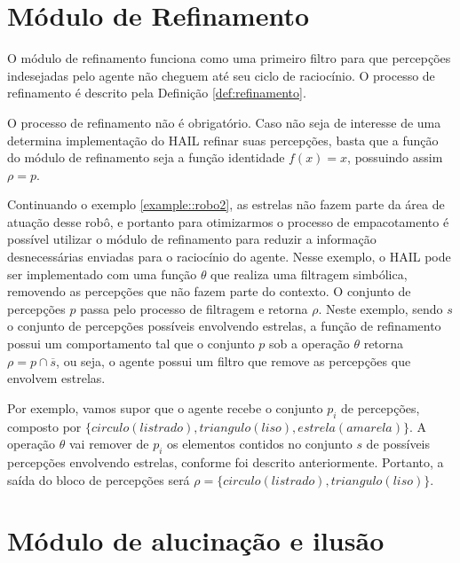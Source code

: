 \section{Módulo de Refinamento}

\label{refinamento}

O módulo de refinamento funciona como uma primeiro filtro para que percepções indesejadas pelo agente não cheguem até seu ciclo de raciocínio. O processo de refinamento é descrito pela Definição \ref{def:refinamento}.

O processo de refinamento não é obrigatório. Caso não seja de interesse de uma determina implementação do HAIL refinar suas percepções, basta que a função do módulo de refinamento seja a função identidade $f(x) = x$, possuindo assim $\rho = p$.

\begin{example}
    Continuando o exemplo \ref{example::robo2}, as estrelas não fazem parte da área de atuação desse robô, e portanto para otimizarmos o processo de empacotamento é possível utilizar o módulo de refinamento para reduzir a informação desnecessárias enviadas para o raciocínio do agente. Nesse exemplo, o HAIL pode ser implementado com uma função $\theta$ que realiza uma filtragem simbólica, removendo as percepções que não fazem parte do contexto. O conjunto de percepções $p$ passa pelo processo de filtragem e retorna $\rho$. Neste exemplo, sendo $s$ o conjunto de percepções possíveis envolvendo estrelas, a função de refinamento possui um comportamento tal que o conjunto $p$ sob a operação $\theta$ retorna $\rho = p \cap \overline{s}$, ou seja, o agente possui um filtro que remove as percepções que envolvem estrelas.
    
    Por exemplo, vamos supor que o agente recebe o conjunto $p_i$ de percepções, composto por $\{circulo(listrado), triangulo(liso), estrela(amarela)\}$. A operação $\theta$ vai remover de $p_i$ os elementos contidos no conjunto $s$ de possíveis percepções envolvendo estrelas, conforme foi descrito anteriormente. Portanto, a saída do bloco de percepções será $\rho = \{circulo(listrado), triangulo(liso)\}$.
    
\end{example}{}

\section{Módulo de alucinação e ilusão}

